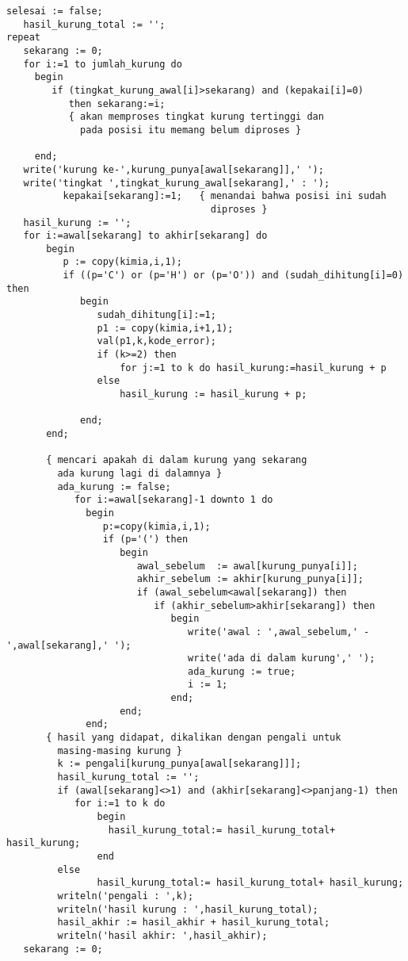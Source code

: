\documentclass[a4paper,10pt,makeidx]{article}
\begin{document}
\begin{verbatim}
selesai := false;
   hasil_kurung_total := '';
repeat
   sekarang := 0;
   for i:=1 to jumlah_kurung do
     begin
        if (tingkat_kurung_awal[i]>sekarang) and (kepakai[i]=0)
           then sekarang:=i;
           { akan memproses tingkat kurung tertinggi dan
             pada posisi itu memang belum diproses }

     end;
   write('kurung ke-',kurung_punya[awal[sekarang]],' ');
   write('tingkat ',tingkat_kurung_awal[sekarang],' : ');
          kepakai[sekarang]:=1;   { menandai bahwa posisi ini sudah
                                    diproses }
   hasil_kurung := '';
   for i:=awal[sekarang] to akhir[sekarang] do
       begin
          p := copy(kimia,i,1);
          if ((p='C') or (p='H') or (p='O')) and (sudah_dihitung[i]=0) then
             begin
                sudah_dihitung[i]:=1;
                p1 := copy(kimia,i+1,1);
                val(p1,k,kode_error);
                if (k>=2) then
                    for j:=1 to k do hasil_kurung:=hasil_kurung + p
                else
                    hasil_kurung := hasil_kurung + p;

             end;
       end;

       { mencari apakah di dalam kurung yang sekarang
         ada kurung lagi di dalamnya }
         ada_kurung := false;
            for i:=awal[sekarang]-1 downto 1 do
              begin
                 p:=copy(kimia,i,1);
                 if (p='(') then
                    begin
                       awal_sebelum  := awal[kurung_punya[i]];
                       akhir_sebelum := akhir[kurung_punya[i]];
                       if (awal_sebelum<awal[sekarang]) then
                          if (akhir_sebelum>akhir[sekarang]) then
                             begin
                                write('awal : ',awal_sebelum,' - ',awal[sekarang],' ');
                                write('ada di dalam kurung',' ');
                                ada_kurung := true;
                                i := 1;
                             end;
                    end;
              end;
       { hasil yang didapat, dikalikan dengan pengali untuk
         masing-masing kurung }
         k := pengali[kurung_punya[awal[sekarang]]];
         hasil_kurung_total := '';
         if (awal[sekarang]<>1) and (akhir[sekarang]<>panjang-1) then
            for i:=1 to k do
                begin
                  hasil_kurung_total:= hasil_kurung_total+ hasil_kurung;
                end
         else
                hasil_kurung_total:= hasil_kurung_total+ hasil_kurung;
         writeln('pengali : ',k);
         writeln('hasil kurung : ',hasil_kurung_total);
         hasil_akhir := hasil_akhir + hasil_kurung_total;
         writeln('hasil akhir: ',hasil_akhir);
   sekarang := 0;


\end{verbatim}
\end{document}
